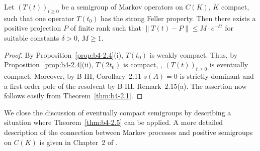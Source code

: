 \begin{theorem}\label{thm:b4-2.5}
	Let $(T(t))_{t \geq 0}$ be a semigroup of Markov operators on
	$C(K)$, $K$ compact, such that one operator $T(t_{0})$ has the strong Feller
	property.
	Then there exists a positive projection $P$ of finite rank
	such that $\|T(t) - P\| \leq M\cdot e^{-\delta t}$ for suitable constants $\delta>0$, $M \geq 1$.
\end{theorem}

\begin{proof}
	By Proposition~\ref{prop:b4-2.4}(i), $T(t_{0})$ is weakly compact.
	Thus, by Proposition~\ref{prop:b4-2.4}(ii),
	$T(2t_{0})$ is compact, \ie, $(T(t))_{t \geq 0}$ is eventually compact.
	Moreover,
	by B-III, Corollary~2.11 $s(A) = 0$ is strictly dominant and a first order
	pole of the resolvent by B-III, Remark~2.15(a).
	The assertion now follows
	easily from Theorem~\ref{thm:b4-2.1}.
\end{proof}
We close the discussion of eventually compact semigroups by describing
a situation where Theorem~\ref{thm:b4-2.5} can be applied.
A more detailed description
of the connection between Markov processes and positive semigroups on
$C(K)$ is given in Chapter~2 of \citet{vancasteren:1985}.

